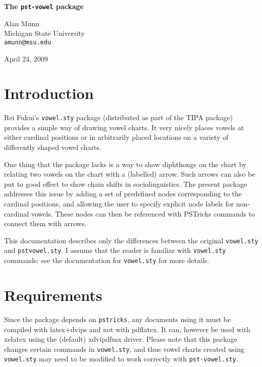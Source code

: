 \documentclass{article}
\begin{document}
\newcommand\bs{\textbackslash}
\newcommand{\pkg}[1]{\texttt{#1}}
\begin{center}
{\Large\bfseries The \pkg{pst-vowel} package}
\vspace{.5in}

\large Alan Munn\\Michigan State University\\\texttt{amunn@msu.edu}

\bigskip
April 24, 2009
\end{center}

\section{Introduction}
Rei Fukui's \pkg{vowel.sty} package (distributed as part of the TIPA package) provides a simple way of drawing vowel charts. It very nicely places vowels at either cardinal positions or in arbitrarily placed locations on a variety of differently shaped vowel charts.

One thing that the package lacks is a way to show diphthongs on the chart by relating two vowels on the chart with a (labelled) arrow. Such arrows can also be put to good effect to show chain shifts in sociolinguistics.  The present package addresses this issue by adding a set of predefined nodes corresponding to the cardinal positions, and allowing the user to specify explicit node labels for non-cardinal vowels. These nodes can then be referenced with PSTricks commands to connect them with arrows.

This documentation describes only the differences between the original \pkg{vowel.sty} and \pkg{pst\-vowel.sty}.  I assume that the reader is familiar with \pkg{vowel.sty} commands; see the documentation for \pkg{vowel.sty} for more details.

\section{Requirements}
Since the package depends on \pkg{pstricks}, any documents using it must be compiled with latex+dvips and not with pdflatex. It can, however be used with xelatex using the (default) xdvipdfmx driver. Please note that this package changes certain commands in \pkg{vowel.sty}, and thus vowel charts created using \pkg{vowel.sty} may need to be modified to work correctly with \pkg{pst-vowel.sty}.
\end{document}
